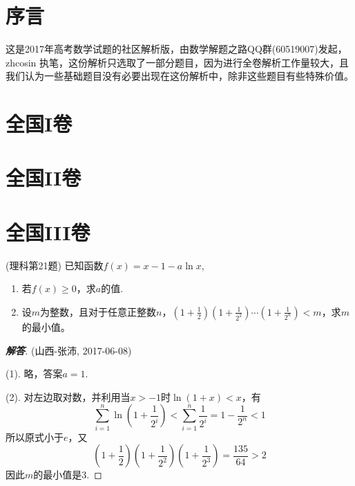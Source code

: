 \documentclass{ctexart}
\title{\kaishu{2017年高考数学试题选析}}
\author{数学解题之路QQ群(60519007)}
\date{更新于: \today}
\begin{document}
\maketitle

\tableofcontents

\section{序言}
\label{sec:preface}

这是2017年高考数学试题的社区解析版，由数学解题之路QQ群(60519007)发起，zhcosin 执笔，这份解析只选取了一部分题目，因为进行全卷解析工作量较大，且我们认为一些基础题目没有必要出现在这份解析中，除非这些题目有些特殊价值。

\section{全国I卷}
\label{sec:nation-1}

\section{全国II卷}
\label{sec:nation-2}

\section{全国III卷}
\label{sec:nation-3}

\begin{exercise}(理科第21题)
  已知函数$f(x)=x-1-a\ln{x}$,
  \begin{enumerate}
  \item 若$f(x) \geqslant 0$，求$a$的值.
  \item 设$m$为整数，且对于任意正整数$n$，$\left( 1+\frac{1}{2} \right)\left( 1+\frac{1}{2^2} \right) \cdots \left( 1+\frac{1}{2^n} \right) <m$，求$m$的最小值。
  \end{enumerate}
\end{exercise}

\begin{proof}[\textbf{解答}](山西-张沛, 2017-06-08)

  (1). 略，答案$a=1$.

  (2). 对左边取对数，并利用当$x>-1$时$\ln{(1+x)}<x$，有
  \[ \sum_{i=1}^n \ln{\left( 1+\frac{1}{2^i} \right)} < \sum_{i=1}^n \frac{1}{2^i} = 1-\frac{1}{2^n} < 1 \]
  所以原式小于$e$，又
  \[ \left( 1+\frac{1}{2} \right)\left( 1+\frac{1}{2^2} \right)\left( 1+\frac{1}{2^3} \right) = \frac{135}{64}>2 \]
  因此$m$的最小值是3.
\end{proof}
\end{document}
